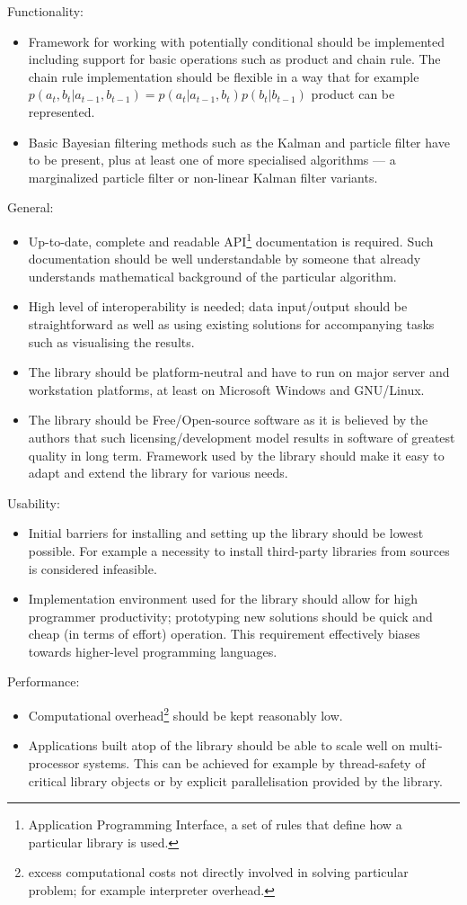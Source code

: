 \noindent Functionality:
\begin{itemize}
	\item Framework for working with potentially conditional {\pdfs} should be implemented
		including support for basic operations such as product and chain rule. The chain rule
		implementation should be flexible in a way that for example
		\(p(a_t,b_t|a_{t-1},b_{t-1}) = p(a_t|a_{t-1},b_t)p(b_t|b_{t-1})\) product can be
		represented.
	\item Basic Bayesian filtering methods such as the Kalman and particle filter have to be present,
		plus at least one of more specialised algorithms --- a marginalized particle filter or
		non-linear Kalman filter variants.
\end{itemize}
General:
\begin{itemize}
	\item Up-to-date, complete and readable API\footnote{Application Programming Interface, a set of
		rules that define how a particular library is used.} documentation is required. Such
		documentation should be well understandable by someone that already understands mathematical
		background of the particular algorithm.
	\item High level of interoperability is needed; data input/output should be straightforward as
		well as using existing solutions for accompanying tasks such as visualising the results.
	\item The library should be platform-neutral and have to run on major server and workstation
		platforms, at least on Microsoft Windows and GNU/Linux.
	\item The library should be Free/Open-source software as it is believed by the authors that such
		licensing/development model results in software of greatest quality in long term. Framework
		used by the library should make it easy to adapt and extend the library for various needs.
\end{itemize}
Usability:
\begin{itemize}
	\item Initial barriers for installing and setting up the library should be lowest possible.
		For example a necessity to install third-party libraries from sources is considered
		infeasible.
	\item Implementation environment used for the library should allow for high programmer
		productivity; prototyping new solutions should be quick and cheap (in terms of effort)
		operation. This requirement effectively biases towards higher-level programming
		languages.
\end{itemize}
Performance:
\begin{itemize}
	\item Computational overhead\footnote{excess computational costs not directly involved
		in solving particular problem; for example interpreter overhead.} should be kept reasonably
		low.
	\item Applications built atop of the library should be able to scale well on multi-processor
		systems. This can be achieved for example by thread-safety of critical library objects
		or by explicit parallelisation provided by the library.
\end{itemize}

